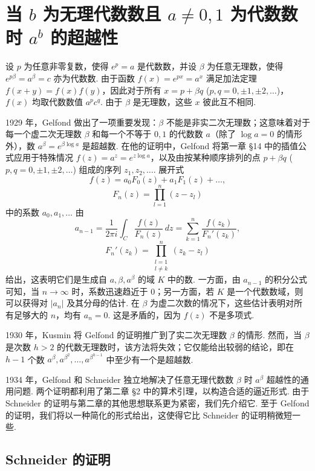 \chapter{当 $b$ 为无理代数数且 $a \neq 0, 1$ 为代数数时 $a^b$ 的超越性}

设 $p$ 为任意非零复数，使得 $e^p = a$ 是代数数，并设 $\beta$ 为任意无理数，使得 $e^{p\beta} = a^\beta = c$ 亦为代数数. 由于函数 $f(x) = e^{px} = a^x$ 满足加法定理 $f(x+y) = f(x)f(y)$，因此对于所有 $x = p + \beta q$ ($p, q = 0, \pm 1, \pm 2, \dots$)，$f(x)$ 均取代数数值 $a^p c^q$. 由于 $\beta$ 是无理数，这些 $x$ 彼此互不相同.

1929 年，Gelfond 做出了一项重要发现：$\beta$ 不能是非实二次无理数；这意味着对于每一个虚二次无理数 $\beta$ 和每一个不等于 $0, 1$ 的代数数 $a$（除了 $\log a = 0$ 的情形外），数 $a^\beta = e^{\beta \log a}$ 是超越数. 在他的证明中，Gelfond 将第一章 \S 14 中的插值公式应用于特殊情况 $f(z) = a^z = e^{z \log a}$，以及由按某种顺序排列的点 $p + \beta q$ ($p, q = 0, \pm 1, \pm 2, \dots$) 组成的序列 $z_1, z_2, \dots$. 展开式
\[
f(z) = a_{0}F_{0}(z) + a_{1}F_{1}(z) + \dots,
\]
\[
F_{n}(z) = \prod_{l=1}^{n} (z-z_{l})
\]
中的系数 $a_0, a_1, \dots$ 由
\[
a_{n-1} = \frac{1}{2\pi i} \int_{C} \frac{f(z)}{F_{n}(z)} \, dz = \sum_{k=1}^{n} \frac{f(z_{k})}{F_{n}'(z_{k})},
\]
\[
F_{n}'(z_{k}) = \prod_{\substack{l=1\\l \neq k}}^{n} (z_{k} - z_{l})
\]
给出，这表明它们是生成自 $a, \beta, a^\beta$ 的域 $K$ 中的数. 一方面，由 $a_{n-1}$ 的积分公式可知，当 $n \to \infty$ 时，系数迅速趋近于 0；另一方面，若 $K$ 是一个代数数域，则可以获得对 $|a_n|$ 及其分母的估计. 在 $\beta$ 为虚二次数的情况下，这些估计表明对所有足够大的 $n$，均有 $a_n = 0$. 这是矛盾的，因为 $f(z)$ 不是多项式.

1930 年，Kusmin 将 Gelfond 的证明推广到了实二次无理数 $\beta$ 的情形. 然而，当 $\beta$ 是次数 $h > 2$ 的代数无理数时，该方法将失效；它仅能给出较弱的结论，即在 $h-1$ 个数 $a^\beta, a^{\beta^2}, \dots, a^{\beta^{h-1}}$ 中至少有一个是超越数.

1934 年，Gelfond 和 Schneider 独立地解决了任意无理代数数 $\beta$ 时 $a^\beta$ 超越性的通用问题. 两个证明都利用了第二章 \S 2 中的算术引理，以构造合适的逼近形式. 由于 Schneider 的证明与第二章的其他思想联系更为紧密，我们先介绍它. 至于 Gelfond 的证明，我们将以一种简化的形式给出，这使得它比 Schneider 的证明稍微短一些.

\section{Schneider 的证明}\label{sec:1}

